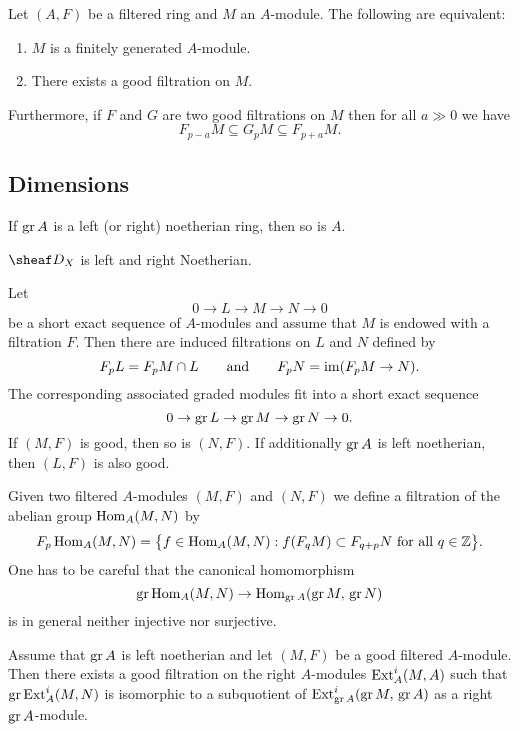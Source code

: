 \documentclass[number-in-sections,a4paper]{notes}
\begin{document}
\begin{Proposition}\label{prop:good-filtration}
    Let $(A,F)$ be a filtered ring and $M$ an $A$-module.
    The following are equivalent:
    \begin{enumerate}
        \item $M$ is a finitely generated $A$-module.
        \item There exists a good filtration on $M$.
    \end{enumerate}
    Furthermore, if $F$ and $G$ are two good filtrations on $M$ then for all $a \gg 0$ we have
    \[
        F_{p-a}M \subseteq G_pM \subseteq F_{p+a}M.
    \]
\end{Proposition}

\subsection{Dimensions}

\begin{Proposition}
    If $\operatorname{gr} A$ is a left (or right) noetherian ring, then so is $A$.
\end{Proposition}

\begin{Corollary}
    $\sD_X$ is left and right Noetherian.
\end{Corollary}

Let
\begin{equation}\label{eq:graded-ses}
    0 \to L \to M \to N \to 0
\end{equation}
be a short exact sequence of $A$-modules and assume that $M$ is endowed with a filtration $F$.
Then there are induced filtrations on $L$ and $N$ defined by
\[
    F_pL = F_pM \cap L
    \qquad\text{and}\qquad
    F_pN = \operatorname{im}(F_pM \to N).
\]
The corresponding associated graded modules fit into a short exact sequence
\[
    0 \to \operatorname{gr} L \to \operatorname{gr} M \to \operatorname{gr} N \to 0.
\]
If $(M,F)$ is good, then so is $(N,F)$.
If additionally $\operatorname{gr} A$ is left noetherian, then $(L,F)$ is also good.

Given two filtered $A$-modules $(M,F)$ and $(N,F)$ we define a filtration of the abelian group $\operatorname{Hom}_A(M,N)$ by
\[
    F_p\operatorname{Hom}_A(M,N) = \bigl\{f \in \operatorname{Hom}_A(M,N) : f(F_qM) \subset F_{q+p}N \text{ for all } q \in {\mathbb{Z}}\bigr\}.
\]
One has to be careful that the canonical homomorphism
\[
    \operatorname{gr} \operatorname{Hom}_A(M,N) \to \operatorname{Hom}_{\operatorname{gr} A}(\operatorname{gr} M,\, \operatorname{gr} N)
\]
is in general neither injective nor surjective.

\begin{Lemma}
    Assume that $\operatorname{gr} A$ is left noetherian and let $(M,F)$ be a good filtered $A$-module.
    Then there exists a good filtration on the right $A$-modules $\operatorname{Ext}_A^i(M,A)$ such that $\operatorname{gr} \operatorname{Ext}^i_A(M,N)$ is isomorphic to a subquotient of $\operatorname{Ext}^i_{\operatorname{gr} A}(\operatorname{gr} M,\, \operatorname{gr} A)$ as a right $\operatorname{gr} A$-module.
\end{Lemma}
\end{document}
